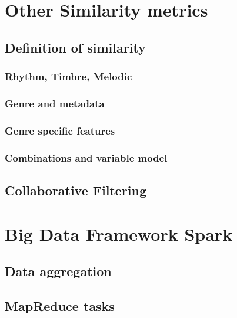 
\chapter{Other Similarity metrics}\label{simmet}

\section{Definition of similarity}

\subsection{Rhythm, Timbre, Melodic}

\subsection{Genre and metadata}

\subsection{Genre specific features}

\subsection{Combinations and variable model}

\section{Collaborative Filtering}


\chapter{Big Data Framework Spark}

\section{Data aggregation}

\section{MapReduce tasks}



